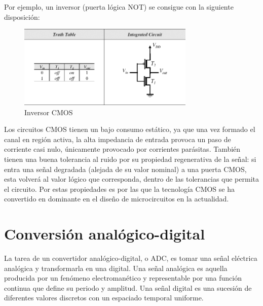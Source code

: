 \documentclass[12pt]{report} %
\begin{document}
	Por ejemplo, un inversor (puerta lógica NOT) se consigue con la siguiente disposición:
	
	\begin{figure}[H]
		\includegraphics[width=0.75\textwidth]{inverter_mos.jpg}
		\caption[Inversor CMOS]{Inversor CMOS\protect\footnotemark}
		\label{fig:inverter_mos.jpg}
	\end{figure}
	
	
	Los circuitos CMOS tienen un bajo consumo estático, ya que una vez formado el canal en región activa, la alta impedancia de entrada provoca un paso de corriente casi nulo, únicamente provocado por corrientes parásitas. También tienen una buena tolerancia al ruido por su propiedad regenerativa de la señal: si entra una señal degradada (alejada de su valor nominal) a una puerta CMOS, esta volverá al valor lógico que corresponda, dentro de las tolerancias que permita el circuito. Por estas propiedades es por las que la tecnología CMOS se ha convertido en dominante en el diseño de microcircuitos en la actualidad.
	
	\section{Conversión analógico-digital}
	
	La tarea de un convertidor analógico-digital, o ADC, es tomar una señal eléctrica analógica y transformarla en una digital. Una señal analógica es aquella producida por un fenómeno electromanético y representable por una función continua que define su periodo y amplitud. Una señal digital es una sucesión de diferentes valores discretos con un espaciado temporal uniforme.
	
\end{document}
